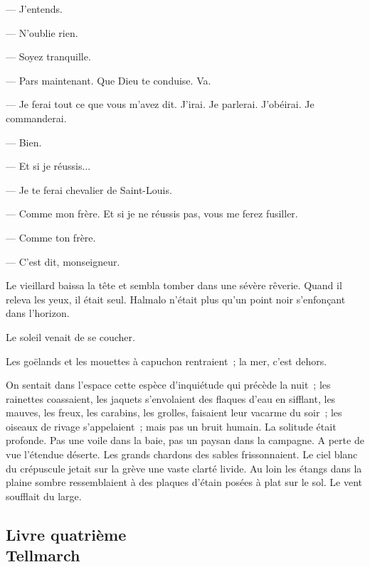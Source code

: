 \documentclass[french,twoside]{book} %
\begin{document}
— J’entends.\par
— N’oublie rien.\par
— Soyez tranquille.\par
— Pars maintenant. Que Dieu te conduise. Va.\par
— Je ferai tout ce que vous m’avez dit. J’irai. Je parlerai. J’obéirai. Je commanderai.\par
— Bien.\par
— Et si je réussis...\par
— Je te ferai chevalier de Saint-Louis.\par
— Comme mon frère. Et si je ne réussis pas, vous me ferez fusiller.\par
— Comme ton frère.\par
— C’est dit, monseigneur.\par
Le vieillard baissa la tête et sembla tomber dans une sévère rêverie. Quand il releva les yeux, il était seul. Halmalo n’était plus qu’un point noir s’enfonçant dans l’horizon.\par
Le soleil venait de se coucher.\par
Les goëlands et les mouettes à capuchon rentraient ; la mer, c’est dehors.\par
On sentait dans l’espace cette espèce d’inquiétude  qui précède la nuit ; les rainettes coassaient, les jaquets s’envolaient des flaques d’eau en sifflant, les mauves, les freux, les carabins, les grolles, faisaient leur vacarme du soir ; les oiseaux de rivage s’appelaient ; mais pas un bruit humain. La solitude était profonde. Pas une voile dans la baie, pas un paysan dans la campagne. A perte de vue l’étendue déserte. Les grands chardons des sables frissonnaient. Le ciel blanc du crépuscule jetait sur la grève une vaste clarté livide. Au loin les étangs dans la plaine sombre ressemblaient à des plaques d’étain posées à plat sur le sol. Le vent soufflait du large.\par
  \subsection[{Livre quatrième. Tellmarch}]{Livre quatrième \\
Tellmarch}
\label{p1l4}
\end{document}
